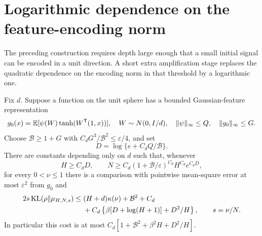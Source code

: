 \section{Logarithmic dependence on the feature-encoding norm}
\label{sec:quantitative-encoding}
The preceding construction requires depth large enough that a small initial signal can be encoded in a unit direction. A short extra amplification stage replaces the quadratic dependence on the encoding norm in that threshold by a logarithmic one.

\begin{theorem}
\label{thm:quantitative-echo}
Fix $d$. Suppose a function on the unit sphere has a bounded Gaussian-feature representation
\[
 g_0(x)=\mathbb E[\psi(W)\tanh(W^{\mathsf T}(1,x))],\quad
 W\sim N(0,I/d),\quad \|\psi\|_\infty\le Q,\quad
 \|g_0\|_\infty\le G.
\]
Choose $\mathcal B\ge1+G$ with $C_dG^3/\mathcal B^2\le\varepsilon/4$, and set
\[
 D=\log\{e+C_dQ/\mathcal B\}.
\]
There are constants depending only on $d$ such that, whenever
\[
 H\ge C_dD,\qquad
 N\ge C_d(1+\mathcal B/\varepsilon)^{C_d}H^{C_d}e^{C_dD},
\]
for every $0<\nu\le1$ there is a comparison with pointwise mean-square error at most $\varepsilon^2$ from $g_0$ and
\begin{align*}
 2s\operatorname{KL}(\rho\|\mu_{H,N,s})
 \le {}&(H+d)\kappa(\nu)+\mathcal B^2+C_d\\
 &+C_d\left\{\beta[D+\log(H+1)]+D^2/H\right\},
 \qquad s=\nu/N.
\end{align*}
In particular this cost is at most $C_d[1+\mathcal B^2+\beta^2H+D^2/H]$.
\end{theorem}

